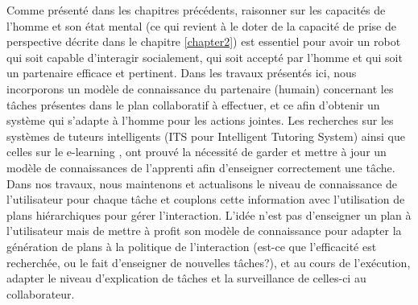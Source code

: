 \documentclass[a4paper,11pt,twoside]{StyleThese}
\begin{document}
Comme présenté dans les chapitres précédents, raisonner sur les capacités de l'homme et son état mental (ce qui revient à le doter de la capacité de prise de perspective décrite dans le chapitre \ref{chapter2}) est essentiel pour avoir un robot qui soit capable d'interagir socialement, qui soit accepté par l'homme et qui soit un partenaire efficace et pertinent.
Dans les travaux présentés ici, nous incorporons un modèle de connaissance du partenaire (humain) concernant les tâches présentes dans le plan collaboratif à effectuer, et ce afin d'obtenir un système qui s'adapte à l'homme pour les actions jointes.
Les recherches sur les systèmes de tuteurs intelligents (ITS pour Intelligent Tutoring System) \cite{brusilovskiy1994construction} ainsi que celles sur le e-learning \cite{brusilovskiy2005}, ont prouvé la nécessité de garder et mettre à jour un modèle de connaissances de l'apprenti afin d'enseigner correctement une tâche.
%
Dans nos travaux, nous maintenons et actualisons le niveau de connaissance de l'utilisateur pour chaque tâche et couplons cette information avec l'utilisation de plans hiérarchiques pour gérer l'interaction. L'idée n'est pas d'enseigner un plan à l'utilisateur mais de mettre à profit son modèle de connaissance pour adapter la génération de plans à la politique de l'interaction (est-ce que l'efficacité est recherchée, ou le fait d'enseigner de nouvelles tâches?), et au cours de l'exécution, adapter le niveau d'explication de tâches et la surveillance de celles-ci au collaborateur.
%
\end{document}
